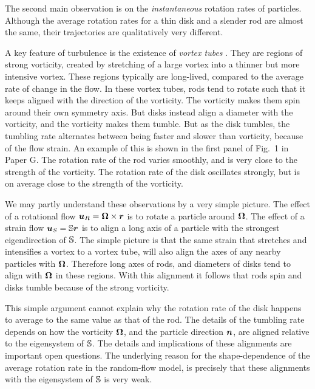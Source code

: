 \documentclass[thesis.tex]{subfiles}
\begin{document}
The second main observation is on the \emph{instantaneous} rotation rates of particles. Although the average rotation rates for a thin disk and a slender rod are almost the same, their trajectories are qualitatively very different.

A key feature of turbulence is the existence of \emph{vortex tubes} \cite{she1990}. They are regions of strong vorticity, created by stretching of a large vortex into a thinner but more intensive vortex. These regions typically are long-lived, compared to the average rate of change in the flow. In these vortex tubes, rods tend to rotate such that it keeps aligned with the direction of the vorticity. The vorticity makes them spin around their own symmetry axis. But disks instead align a diameter with the vorticity, and the vorticity makes them tumble. But as the disk tumbles, the tumbling rate alternates between being faster and slower than vorticity, because of the flow strain. An example of this is shown in the first panel of Fig.~1 in Paper G. The rotation rate of the rod varies smoothly, and is very close to the strength of the vorticity. The rotation rate of the disk oscillates strongly, but is on average close to the strength of the vorticity.

We may partly understand these observations by a very simple picture. The effect of a rotational flow $\mbox{\boldmath$u$}_R= \mbox{\boldmath$\Omega$} \times \mbox{\boldmath$r$}$ is to rotate a particle around $\mbox{\boldmath$\Omega$}$. The effect of a strain flow $\mbox{\boldmath$u$}_S=\mathbb{S} \mbox{\boldmath$r$}$ is to align a long axis of a particle with the strongest eigendirection of $\mathbb{S}$. The simple picture is that the same strain that stretches and intensifies a vortex to a vortex tube, will also align the axes of any nearby particles with $\mbox{\boldmath$\Omega$}$. Therefore long axes of rods, and diameters of disks tend to align with $\mbox{\boldmath$\Omega$}$ in these regions. With this alignment it follows that rods spin and disks tumble because of the strong vorticity.

This simple argument cannot explain why the rotation rate of the disk happens to average to the same value as that of the rod. The details of the tumbling rate depends on how the vorticity $\mbox{\boldmath$\Omega$}$, and the particle direction $\mbox{\boldmath$n$}$, are aligned relative to the eigensystem of $\mathbb{S}$. The details and implications of these alignments are important open questions. The underlying reason for the shape-dependence of the average rotation rate in the random-flow model, is precisely that these alignments with the eigensystem of $\mathbb{S}$ is very weak.
\end{document}
